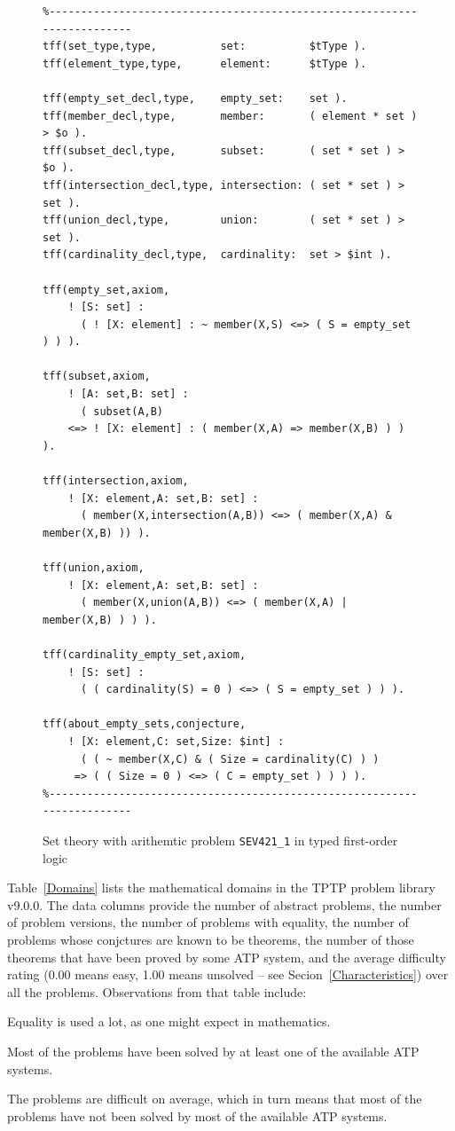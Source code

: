 \documentclass[runningheads]{llncs}
\newenvironment{packed_itemize}{
\vspace*{-0.2em}
\begin{itemize}
\setlength{\partopsep}{0pt}
\setlength{\itemsep}{1pt}
\setlength{\parskip}{0pt}
\setlength{\parsep}{0pt}
}{\end{itemize}}
\begin{document}
\begin{figure}[htb]
\centering
{\footnotesize
{\setlength{\baselineskip}{3mm}
\begin{verbatim}
%------------------------------------------------------------------------
tff(set_type,type,          set:          $tType ).
tff(element_type,type,      element:      $tType ).

tff(empty_set_decl,type,    empty_set:    set ).
tff(member_decl,type,       member:       ( element * set ) > $o ).
tff(subset_decl,type,       subset:       ( set * set ) > $o ).
tff(intersection_decl,type, intersection: ( set * set ) > set ).
tff(union_decl,type,        union:        ( set * set ) > set ).
tff(cardinality_decl,type,  cardinality:  set > $int ).

tff(empty_set,axiom,
    ! [S: set] :
      ( ! [X: element] : ~ member(X,S) <=> ( S = empty_set ) ) ).

tff(subset,axiom,
    ! [A: set,B: set] :
      ( subset(A,B)
    <=> ! [X: element] : ( member(X,A) => member(X,B) ) ) ).

tff(intersection,axiom,
    ! [X: element,A: set,B: set] :
      ( member(X,intersection(A,B)) <=> ( member(X,A) & member(X,B) )) ).

tff(union,axiom,
    ! [X: element,A: set,B: set] :
      ( member(X,union(A,B)) <=> ( member(X,A) | member(X,B) ) ) ).

tff(cardinality_empty_set,axiom,
    ! [S: set] :
      ( ( cardinality(S) = 0 ) <=> ( S = empty_set ) ) ).

tff(about_empty_sets,conjecture,
    ! [X: element,C: set,Size: $int] :
      ( ( ~ member(X,C) & ( Size = cardinality(C) ) )
     => ( ( Size = 0 ) <=> ( C = empty_set ) ) ) ).
%------------------------------------------------------------------------
\end{verbatim}
}}
\caption{Set theory with arithemtic problem {\tt SEV421\_1} in typed first-order logic}
\label{ExampleTF0}
\end{figure}

Table~\ref{Domains} lists the mathematical domains in the TPTP problem library v9.0.0.
The data columns provide the number of abstract problems, the number of problem versions, the
number of problems with equality, the number of problems whose conjctures are known to be
theorems, the number of those theorems that have been proved by some ATP system, and the average 
difficulty rating (0.00 means easy, 1.00 means unsolved -- see Secion~\ref{Characteristics}) over 
all the problems.
Observations from that table include:
\begin{packed_itemize}
\item Equality is used a lot, as one might expect in mathematics.
\item Most of the problems have been solved by at least one of the available ATP systems.
\item The problems are difficult on average, which in turn means that most of the problems have
      not been solved by most of the available ATP systems.
\end{packed_itemize}
\end{document}
